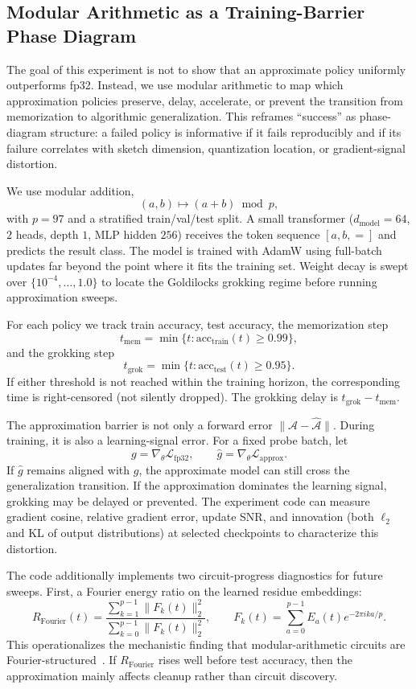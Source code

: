 \subsection{Modular Arithmetic as a Training-Barrier Phase Diagram}

The goal of this experiment is not to show that an approximate policy uniformly outperforms fp32. Instead, we use modular arithmetic to map which approximation policies preserve, delay, accelerate, or prevent the transition from memorization to algorithmic generalization. This reframes ``success'' as phase-diagram structure: a failed policy is informative if it fails reproducibly and if its failure correlates with sketch dimension, quantization location, or gradient-signal distortion.

We use modular addition,
\[
    (a,b)\mapsto (a+b)\bmod p,
\]
with $p=97$ and a stratified train/val/test split. A small transformer ($d_{\mathrm{model}}=64$, $2$ heads, depth $1$, MLP hidden $256$) receives the token sequence $[a,b,=]$ and predicts the result class. The model is trained with AdamW using full-batch updates far beyond the point where it fits the training set. Weight decay is swept over $\{10^{-4},\ldots,1.0\}$ to locate the Goldilocks grokking regime before running approximation sweeps.

For each policy we track train accuracy, test accuracy, the memorization step
\[
    t_{\mathrm{mem}}=\min\{t:\mathrm{acc}_{\mathrm{train}}(t)\ge0.99\},
\]
and the grokking step
\[
    t_{\mathrm{grok}}=\min\{t:\mathrm{acc}_{\mathrm{test}}(t)\ge0.95\}.
\]
If either threshold is not reached within the training horizon, the corresponding time is right-censored (not silently dropped). The grokking delay is $t_{\mathrm{grok}}-t_{\mathrm{mem}}$.

The approximation barrier is not only a forward error $\|\mathcal A-\widehat{\mathcal A}\|$. During training, it is also a learning-signal error. For a fixed probe batch, let
\[
    g=\nabla_\theta \mathcal L_{\mathrm{fp32}},
    \qquad
    \widehat g=\nabla_\theta \mathcal L_{\mathrm{approx}}.
\]
If $\widehat g$ remains aligned with $g$, the approximate model can still cross the generalization transition. If the approximation dominates the learning signal, grokking may be delayed or prevented. The experiment code can measure gradient cosine, relative gradient error, update SNR, and innovation (both $\ell_2$ and KL of output distributions) at selected checkpoints to characterize this distortion.

The code additionally implements two circuit-progress diagnostics for future sweeps. First, a Fourier energy ratio on the learned residue embeddings:
\[
    R_{\mathrm{Fourier}}(t)
    =
    \frac{\sum_{k=1}^{p-1}\|F_k(t)\|_2^2}
    {\sum_{k=0}^{p-1}\|F_k(t)\|_2^2},
    \qquad
    F_k(t)
    =
    \sum_{a=0}^{p-1} E_a(t) e^{-2\pi i ka/p}.
\]
This operationalizes the mechanistic finding that modular-arithmetic circuits are Fourier-structured~\autocite{Nanda2023}. If $R_{\mathrm{Fourier}}$ rises well before test accuracy, then the approximation mainly affects cleanup rather than circuit discovery.

